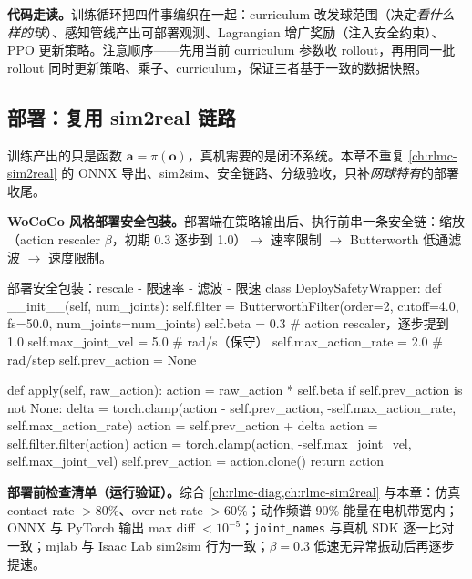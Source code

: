 \textbf{代码走读。}训练循环把四件事编织在一起：curriculum 改发球范围（决定\emph{看什么样的球}）、感知管线产出可部署观测、Lagrangian 增广奖励（注入安全约束）、PPO 更新策略。注意顺序——先用当前 curriculum 参数收 rollout，再用同一批 rollout 同时更新策略、乘子、curriculum，保证三者基于一致的数据快照。

\subsection{部署：复用 sim2real 链路}

训练产出的只是函数 $\mathbf{a}=\pi(\mathbf{o})$，真机需要的是闭环系统。本章不重复 \cref{ch:rlmc-sim2real} 的 ONNX 导出、sim2sim、安全链路、分级验收，只补\emph{网球特有}的部署收尾。

\textbf{WoCoCo 风格部署安全包装。}部署端在策略输出后、执行前串一条安全链：缩放（action rescaler $\beta$，初期 0.3 逐步到 1.0）$\to$ 速率限制 $\to$ Butterworth 低通滤波 $\to$ 速度限制。

\begin{codebox}[Python]{部署安全包装：rescale - 限速率 - 滤波 - 限速}
class DeploySafetyWrapper:
    def __init__(self, num_joints):
        self.filter = ButterworthFilter(order=2, cutoff=4.0, fs=50.0,
                                        num_joints=num_joints)
        self.beta = 0.3                 # action rescaler，逐步提到 1.0
        self.max_joint_vel = 5.0        # rad/s（保守）
        self.max_action_rate = 2.0      # rad/step
        self.prev_action = None

    def apply(self, raw_action):
        action = raw_action * self.beta
        if self.prev_action is not None:
            delta = torch.clamp(action - self.prev_action,
                                -self.max_action_rate, self.max_action_rate)
            action = self.prev_action + delta
        action = self.filter.filter(action)
        action = torch.clamp(action, -self.max_joint_vel, self.max_joint_vel)
        self.prev_action = action.clone()
        return action
\end{codebox}

\textbf{部署前检查清单（运行验证）。}综合 \cref{ch:rlmc-diag,ch:rlmc-sim2real} 与本章：仿真 contact rate $>80\%$、over-net rate $>60\%$；动作频谱 90\% 能量在电机带宽内；ONNX 与 PyTorch 输出 max diff $<10^{-5}$；\verb|joint_names| 与真机 SDK 逐一比对一致；mjlab 与 Isaac Lab sim2sim 行为一致；$\beta=0.3$ 低速无异常振动后再逐步提速。

